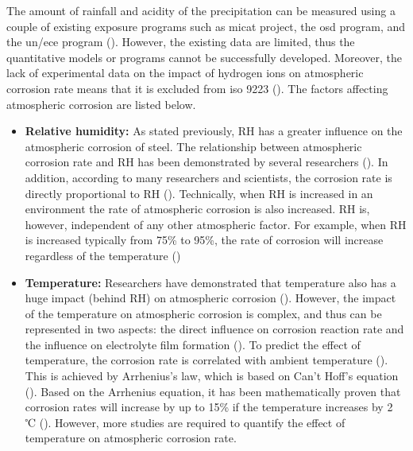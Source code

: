 The amount of rainfall and acidity of the precipitation can be measured using a couple of existing exposure programs such as \Acrfull{micat} project, the \Acrfull{osd} program, and the \Acrfull{un/ece} program (\cite{cai2018influence}). However, the existing data are limited, thus the quantitative models or programs cannot be successfully developed. Moreover, the lack of experimental data on the impact of hydrogen ions on atmospheric corrosion rate means that it is excluded from \acrshort{iso} 9223 (\cite{protopopoff2011surface}). The factors affecting atmospheric corrosion are listed below.

\begin{itemize}
    \item \textbf{Relative humidity:} As stated previously, RH has a greater influence on the atmospheric corrosion of steel. The relationship between atmospheric corrosion rate and RH has been demonstrated by several researchers (\cite{dong2005deformation, islam2018effects}). In addition, according to many researchers and scientists, the corrosion rate is directly proportional to RH (\cite{dong2005deformation, islam2018effects}). Technically, when RH is increased in an environment the rate of atmospheric corrosion is also increased. RH is, however, independent of any other atmospheric factor. For example, when RH is increased typically from 75\% to 95\%, the rate of corrosion will increase regardless of the temperature (\cite{sourmail2005stainless})
    
    \item \textbf{Temperature:}  Researchers have demonstrated that temperature also has a huge impact (behind RH) on atmospheric corrosion (\cite{cengel1998heat, islam2018effects}). However, the impact of the temperature on atmospheric corrosion is complex, and thus can be represented in two aspects: the direct influence on corrosion reaction rate and the influence on electrolyte film formation (\cite{cai2018influence}). To predict the effect of temperature, the corrosion rate is correlated with ambient temperature (\cite{pei2021understanding}).  This is achieved by Arrhenius's law, which is based on Can't Hoff’s equation (\cite{cai2018influence}). Based on the Arrhenius equation, it has been mathematically proven that corrosion rates will increase by up to 15\% if the temperature increases by 2 ℃ (\cite{mcarthur2004engineering}). However, more studies are required to quantify the effect of temperature on atmospheric corrosion rate.  
    

\end{itemize}
